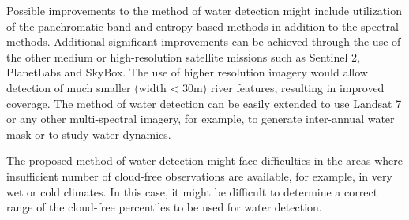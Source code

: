 Possible improvements to the method of water detection might include utilization of the panchromatic band and entropy-based methods in addition to the spectral methods. Additional significant improvements can be achieved through the use of the other medium or high-resolution satellite missions such as Sentinel 2, PlanetLabs and SkyBox. The use of higher resolution imagery would allow detection of much smaller (width < 30m) river features, resulting in improved coverage.
The method of water detection can be easily extended to use Landsat 7 or any other multi-spectral imagery, for example, to generate inter-annual water mask or to study water dynamics. 

The proposed method of water detection might face difficulties in the areas where insufficient number of cloud-free observations are available, for example, in very wet or cold climates. In this case, it might be difficult to determine a correct range of the cloud-free percentiles to be used for water detection. 
